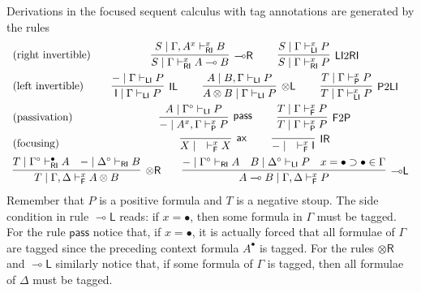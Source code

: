 \documentclass[copyright,creativecommons]{eptcs}
\theoremstyle{definition}
\newcommand{\tl}{\otimes \mathsf{L}}
\newcommand{\tr}{\otimes \mathsf{R}}
\newcommand{\lright}{{\multimap}\mathsf{R}}
\newcommand{\lleft}{{\multimap}\mathsf{L}}
\newcommand{\pass}{\mathsf{pass}}
\newcommand{\unitl}{\mathsf{IL}}
\newcommand{\unitr}{\mathsf{IR}}
\newcommand{\ax}{\mathsf{ax}}
\newcommand{\ot}{\otimes}
\newcommand{\lolli}{\multimap}
\newcommand{\I}{\mathsf{I}}
\newcommand{\RI}{\mathsf{RI}}
\newcommand{\LI}{\mathsf{LI}}
\newcommand{\Pass}{\mathsf{P}}
\newcommand{\F}{\mathsf{F}}
\newcommand{\xvdash}{\vdash^{x}}
\newcommand{\proofbox}[1]{\begin{tabular}{l} #1 \end{tabular}}
\begin{document}
Derivations in the focused sequent calculus with tag annotations are generated by the rules
\begin{equation}\label{eq:focus}
  \begin{array}{lc}
    \text{(right invertible)} & %
    \proofbox{
      \infer[\lright]{S \mid \Gamma \vdash^{x}_{\RI} A \lolli B}{S \mid \Gamma , A^{x} \vdash^{x}_{\RI} B}
    \qquad
    \infer[\LI 2 \RI]{S \mid \Gamma \vdash^{x}_{\RI} P}{S \mid \Gamma \vdash^{x}_{\LI} P}
    }
    \\[10pt]
    \text{(left invertible)} & %
    \proofbox{
      \infer[\unitl]{\I \mid \Gamma \vdash_{\LI} P}{{-} \mid \Gamma \vdash_{\LI} P}
    \qquad
    \infer[\tl]{A \ot B \mid \Gamma \vdash_{\LI} P}{A \mid B , \Gamma \vdash_{\LI} P}
    \qquad
    \infer[\Pass 2 \LI]{T \mid \Gamma \xvdash_{\LI} P}{T \mid \Gamma \xvdash_{\Pass} P}
    }
    \\[10pt]
    \text{(passivation)} &
    \proofbox{
    \infer[\pass]{{-} \mid A^{x} , \Gamma \xvdash_{\Pass} P }{
      A\mid \Gamma^{\circ} \vdash_{\LI} P
    }
    \qquad
    \infer[\F 2 \Pass]{T \mid \Gamma \xvdash_{\Pass} P}{
      T \mid \Gamma \xvdash_{\F} P
    }
    }
    \\[10pt]
    \text{(focusing)} &    %
    \proofbox{\infer[\ax]{X \mid \quad \xvdash_{\F} X}{}
    \qquad
    \infer[\unitr]{{-} \mid \quad \xvdash_{\F} \I}{}
    }
    \\[6pt]
    \multicolumn{2}{c}{
    \infer[\tr]{T \mid \Gamma , \Delta \xvdash_{\F} A \ot B}{
      T \mid \Gamma^{\circ} \vdash^{\bullet}_{\RI} A
      &
      {-} \mid \Delta^{\circ} \vdash_{\RI} B
    }
    \qquad
    \infer[\lleft]{A \lolli B \mid \Gamma , \Delta \xvdash_{\F} P}{
      {-} \mid \Gamma^{\circ} \vdash_{\RI} A
      &
      B \mid \Delta^{\circ} \vdash_{\LI} P
      &
      x = \bullet \supset \bullet \in \Gamma
    }
    }
  \end{array}
\end{equation}
Remember that $P$ is a positive formula and $T$ is a negative stoup. The side condition in rule $\lleft$ reads: if $x = \bullet$, then some formula in $\Gamma$ must be tagged. For the rule $\pass$ notice that, if $x = \bullet$, it is actually forced that all formulae of $\Gamma$ are tagged since the preceding context formula $A^\bullet$ is tagged. For the rules $\tr$ and $\lleft$ similarly notice that,
if some formula of $\Gamma$ is tagged, then all formulae of $\Delta$ must be tagged.
\end{document}
